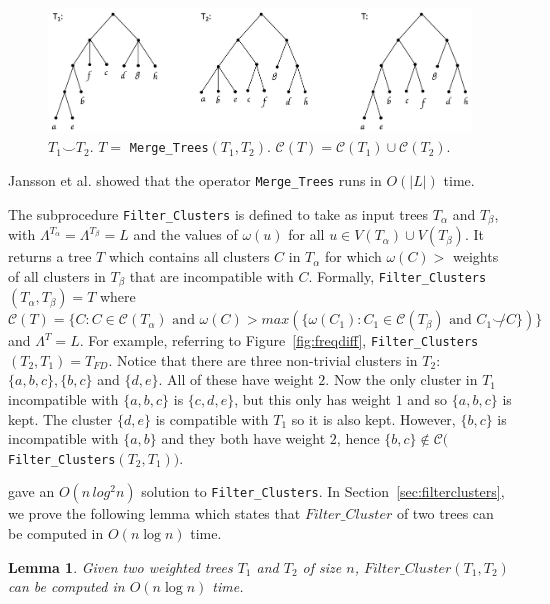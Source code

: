 \documentclass[final,1p,times]{elsarticle}
\newcommand{\compatible}{\smile}
\newcommand{\leafset}{\Lambda}
\newcommand{\weight}{\omega}
\newcommand{\TA}{T_\alpha}
\newcommand{\TB}{T_\beta}
\newtheorem{lemma}[theorem]{Lemma}
\begin{document}
    \begin{figure}[ht]
        \includegraphics[scale=0.5]{mergetrees}
        \centering
        \caption[The \texttt{Merge\_Trees} algorithm]{$T_1 \compatible T_2$. $T =$ \texttt{Merge\_Trees}$(T_1, T_2)$. $\mathcal{C}(T) = \mathcal{C}(T_1) \cup \mathcal{C}(T_2)$.}
        \label{fig:mergetrees}
    \end{figure}
    Jansson et al.\cite{jansson2016improved} showed that the operator \texttt{Merge\_Trees} runs in $O(|L|)$ time.

    The subprocedure \texttt{Filter\_Clusters} is defined to take as input trees $\TA$ and $\TB$, with $\leafset^{\TA} = \leafset^{\TB} = L$ and the values of $\weight(u)$ for all $u \in V(\TA) \cup V(\TB)$. It returns a tree $T$ which contains all clusters $C$ in $\TA$ for which $\weight(C) > $ weights of all clusters in $\TB$ that are incompatible with $C$. Formally, \texttt{Filter\_Clusters}$(\TA, \TB) = T$ where $\mathcal{C}(T) = \{C : C \in \mathcal{C}(\TA) \text{ and } \weight(C) > max(\{\weight(C_1) : C_1 \in \mathcal{C}(\TB) \text{ and } C_1 \not\compatible C\})\}$ and $\leafset^T = L$. For example, referring to Figure~\ref{fig:freqdiff}, \texttt{Filter\_Clusters}$(T_2, T_1) = T_{FD}$. Notice that there are three non-trivial clusters in $T_2$: $\{a, b, c\}, \{b, c\}$ and $\{d, e\}$. All of these have weight $2$. Now the only cluster in $T_1$ incompatible with $\{a, b, c\}$ is $\{c, d, e\}$, but this only has weight $1$ and so $\{a, b, c\}$ is kept. The cluster $\{d, e\}$ is compatible with $T_1$ so it is also kept. However, $\{b, c\}$ is incompatible with $\{a, b\}$ and they both have weight $2$, hence $\{b, c\} \not\in \mathcal{C}($\texttt{Filter\_Clusters}$(T_2, T_1))$.

    \cite{jansson2018algorithms} gave an $O(n\,log^2n)$ solution to \texttt{Filter\_Clusters}. In Section~\ref{sec:filterclusters}, we prove the following lemma which states that $Filter\_Cluster$ of two trees can be computed in $O(n \log n)$ time.
    \begin{lemma}
	    \label{lem-filter-cluster-time}
	    Given two weighted trees $T_1$ and $T_2$ of size $n$,
	    $Filter\_Cluster(T_1, T_2)$ can be computed in $O(n \log n)$ time.
    \end{lemma}
\end{document}
